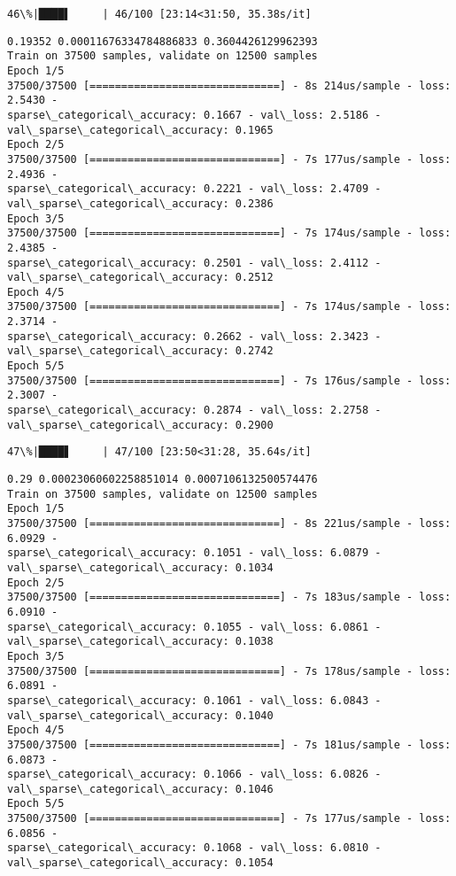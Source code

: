 \documentclass[11pt]{article}
\begin{document}
    \begin{Verbatim}[commandchars=\\\{\}]
 46\%|████▌     | 46/100 [23:14<31:50, 35.38s/it]
    \end{Verbatim}

    \begin{Verbatim}[commandchars=\\\{\}]
0.19352 0.00011676334784886833 0.3604426129962393
Train on 37500 samples, validate on 12500 samples
Epoch 1/5
37500/37500 [==============================] - 8s 214us/sample - loss: 2.5430 -
sparse\_categorical\_accuracy: 0.1667 - val\_loss: 2.5186 -
val\_sparse\_categorical\_accuracy: 0.1965
Epoch 2/5
37500/37500 [==============================] - 7s 177us/sample - loss: 2.4936 -
sparse\_categorical\_accuracy: 0.2221 - val\_loss: 2.4709 -
val\_sparse\_categorical\_accuracy: 0.2386
Epoch 3/5
37500/37500 [==============================] - 7s 174us/sample - loss: 2.4385 -
sparse\_categorical\_accuracy: 0.2501 - val\_loss: 2.4112 -
val\_sparse\_categorical\_accuracy: 0.2512
Epoch 4/5
37500/37500 [==============================] - 7s 174us/sample - loss: 2.3714 -
sparse\_categorical\_accuracy: 0.2662 - val\_loss: 2.3423 -
val\_sparse\_categorical\_accuracy: 0.2742
Epoch 5/5
37500/37500 [==============================] - 7s 176us/sample - loss: 2.3007 -
sparse\_categorical\_accuracy: 0.2874 - val\_loss: 2.2758 -
val\_sparse\_categorical\_accuracy: 0.2900
    \end{Verbatim}

    \begin{Verbatim}[commandchars=\\\{\}]
 47\%|████▋     | 47/100 [23:50<31:28, 35.64s/it]
    \end{Verbatim}

    \begin{Verbatim}[commandchars=\\\{\}]
0.29 0.00023060602258851014 0.0007106132500574476
Train on 37500 samples, validate on 12500 samples
Epoch 1/5
37500/37500 [==============================] - 8s 221us/sample - loss: 6.0929 -
sparse\_categorical\_accuracy: 0.1051 - val\_loss: 6.0879 -
val\_sparse\_categorical\_accuracy: 0.1034
Epoch 2/5
37500/37500 [==============================] - 7s 183us/sample - loss: 6.0910 -
sparse\_categorical\_accuracy: 0.1055 - val\_loss: 6.0861 -
val\_sparse\_categorical\_accuracy: 0.1038
Epoch 3/5
37500/37500 [==============================] - 7s 178us/sample - loss: 6.0891 -
sparse\_categorical\_accuracy: 0.1061 - val\_loss: 6.0843 -
val\_sparse\_categorical\_accuracy: 0.1040
Epoch 4/5
37500/37500 [==============================] - 7s 181us/sample - loss: 6.0873 -
sparse\_categorical\_accuracy: 0.1066 - val\_loss: 6.0826 -
val\_sparse\_categorical\_accuracy: 0.1046
Epoch 5/5
37500/37500 [==============================] - 7s 177us/sample - loss: 6.0856 -
sparse\_categorical\_accuracy: 0.1068 - val\_loss: 6.0810 -
val\_sparse\_categorical\_accuracy: 0.1054
    \end{Verbatim}
\end{document}
